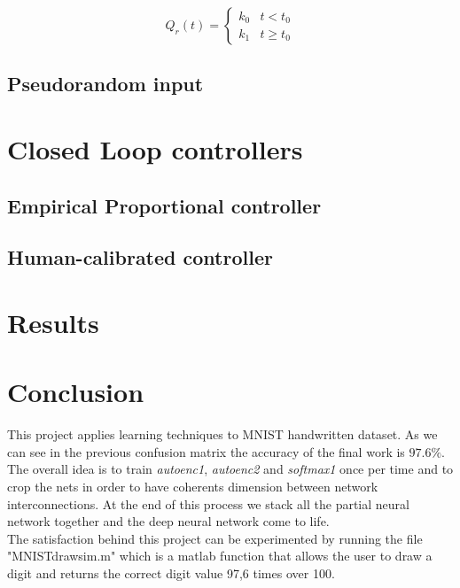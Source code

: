 $$
Q_r(t) =   
\begin{cases} 
k_0 & t < t_0\\
k_1 & t \geq t_0
\end{cases}
$$


\section{Pseudorandom input}

\chapter{Closed Loop controllers}
\section{Empirical Proportional controller}
\section{Human-calibrated controller}
\chapter{Results}

\chapter*{Conclusion}
This project applies learning \cite{art:rif.1} techniques to MNIST handwritten dataset. As we can see in the previous confusion matrix the accuracy of the final work is $97.6\%$. The overall idea is to train \emph{autoenc1},  \emph{autoenc2} and \emph{softmax1} once per time and to crop the nets in order to have coherents dimension between network interconnections. At the end of \cite{book:rif.2}this process we stack all the partial neural network together and the deep neural network come to life. \\The satisfaction behind this project can be experimented by running the file "MNIST\textunderscore drawsim.m" which is a matlab function that allows the user to draw a digit and returns the correct digit value 97,6 times over 100.